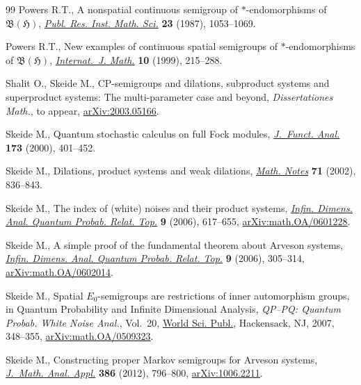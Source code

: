 \documentclass[pdftex]{sigma}%
\numberwithin{equation}{section}
\begin{document}
\begin{thebibliography}{99}
Powers R.T., A nonspatial continuous semigroup of {$*$}-endomorphisms of
 {${\mathfrak B}({\mathfrak H})$}, \href{https://doi.org/10.2977/prims/1195175872}{\textit{Publ. Res. Inst. Math. Sci.}}
 \textbf{23} (1987), 1053--1069.

Powers R.T., New examples of continuous spatial semigroups of
 {$\ast$}-endomorphisms of {$\mathfrak B(\mathfrak H)$}, \href{https://doi.org/10.1142/S0129167X99000094}{\textit{Internat.~J.
 Math.}} \textbf{10} (1999), 215--288.

Shalit O., Skeide M., CP-semigroups and dilations, subproduct systems and
 superproduct systems: The multi-parameter case and beyond,
 \textit{Dissertationes Math.}, {t}o appear, \href{https://arxiv.org/abs/2003.05166}{arXiv:2003.05166}.

Skeide M., Quantum stochastic calculus on full {F}ock modules,
 \href{https://doi.org/10.1006/jfan.2000.3579}{\textit{J.~Funct. Anal.}} \textbf{173} (2000), 401--452.

Skeide M., Dilations, product systems and weak dilations, \href{https://doi.org/10.1023/A:1015829130671}{\textit{Math. Notes}}
 \textbf{71} (2002), 836--843.

Skeide M., The index of (white) noises and their product systems,
 \href{https://doi.org/10.1142/S0219025706002573}{\textit{Infin. Dimens. Anal. Quantum Probab. Relat. Top.}} \textbf{9} (2006),
 617--655, \href{https://arxiv.org/abs/math.OA/0601228}{arXiv:math.OA/0601228}.

Skeide M., A simple proof of the fundamental theorem about {A}rveson systems,
 \href{https://doi.org/10.1142/S0219025706002378}{\textit{Infin. Dimens. Anal. Quantum Probab. Relat. Top.}} \textbf{9} (2006),
 305--314, \href{https://arxiv.org/abs/math.OA/0602014}{arXiv:math.OA/0602014}.

Skeide M., Spatial {$E_0$}-semigroups are restrictions of inner automorphism
 groups, in Quantum Probability and Infinite Dimensional Analysis,
 \textit{QP--PQ: Quantum Probab. White Noise Anal.}, Vol.~20, \href{https://doi.org/10.1142/9789812770271_0037}{World Sci.
 Publ.}, Hackensack, NJ, 2007, 348--355, \href{https://arxiv.org/abs/math.OA/0509323}{arXiv:math.OA/0509323}.

Skeide M., Constructing proper {M}arkov semigroups for {A}rveson systems,
 \href{https://doi.org/10.1016/j.jmaa.2011.08.036}{\textit{J.~Math. Anal. Appl.}} \textbf{386} (2012), 796--800,
 \href{https://arxiv.org/abs/1006.2211}{arXiv:1006.2211}.


\end{thebibliography}
\end{document}
